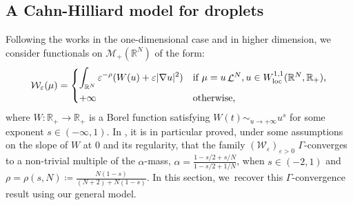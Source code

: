 \documentclass[10pt]{amsart}
\theoremstyle{plain}
\theoremstyle{definition}
\newcommand{\R}{\mathbb{R}}
\newcommand{\Mspace}{\mathscr{M}}
\newcommand{\loc}{\mathrm{loc}}
\newcommand{\eps}{\varepsilon}
\DeclarePairedDelimiter{\abs}{\lvert}{\rvert}
\DeclareMathOperator{\lbm}{\mathcal{L}}
\begin{document}
\subsection{A Cahn-Hilliard model for droplets\label{droplets}}
Following the works \cite{bouchitteTransitionsPhasesAvec1996} in the one-dimensional case and \cite{dubsProblemesPerturbationsSingulieres1998} in higher dimension, we consider functionals on $\Mspace_+(\R^N)$ of the form:
\begin{equation}\label{defW}
\mathcal W_\eps(\mu) = \begin{dcases*}
\int_{\R^N} \eps^{-\rho} (W(u) + \eps\abs{\nabla u}^2) & if $\mu = u \lbm^N, u\in W^{1,1}_\loc(\R^N,\R_+)$,\\
+\infty& otherwise,
\end{dcases*}
\end{equation}
where $W : \R_+ \to \R_+$ is a Borel function satisfying $W(t) \sim_{u\to+\infty} u^s$ for some exponent $s\in (-\infty,1)$. In \cite{bouchitteTransitionsPhasesAvec1996, dubsProblemesPerturbationsSingulieres1998}, it is in particular proved, under some assumptions on the slope of $W$ at $0$ and its regularity, that the family $(\mathcal W_\eps)_{\eps > 0}$ $\Gamma$-converges to a non-trivial multiple of the $\alpha$-mass, $\alpha = \frac{1-s/2+s/N}{1-s/2+1/N}$, when $s \in (-2,1)$ and $\rho = \rho(s,N) \coloneqq \frac{N(1-s)}{(N+2)+N(1-s)}$.
In this section, we~recover this $\Gamma$-convergence result using our general model.
\end{document}
